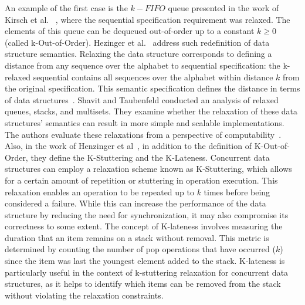 An example of the first case is the \(k-FIFO\) queue presented in the work of Kirsch et al. ~\cite{DBLP_conf_pact_KirschLP13, DBLP_conf_ica3pp_KirschPRS12}, where the sequential specification requirement was relaxed. The elements of this queue can be dequeued out-of-order up to a constant \(k \ge 0\) (called k-Out-of-Order). Hezinger et al.~\cite{DBLP_conf_popl_HenzingerKPSS13} address such redefinition of data structure semantics. Relaxing the data structure corresponds to defining a distance from any sequence over the alphabet to sequential specification: the k-relaxed sequential contains all sequences over the alphabet within distance \(k\) from the original specification. This semantic specification defines the distance in terms of data structures~\cite{DBLP_conf_popl_HenzingerKPSS13}. Shavit and Taubenfeld conducted an analysis of relaxed queues, stacks, and multisets. They examine whether the relaxation of these data structures' semantics can result in more simple and scalable implementations. The authors evaluate these relaxations from a perspective of computability~\cite{DBLP_journals_dc_ShavitT16}. Also, in the work of Henzinger et al~\cite{DBLP_conf_popl_HenzingerKPSS13}, in addition to the definition of K-Out-of-Order, they define the K-Stuttering and the K-Lateness. Concurrent data structures can employ a relaxation scheme known as K-Stuttering, which allows for a certain amount of repetition or stuttering in operation execution. This relaxation enables an operation to be repeated up to \(k\) times before being considered a failure. While this can increase the performance of the data structure by reducing the need for synchronization, it may also compromise its correctness to some extent. The concept of K-lateness involves measuring the duration that an item remains on a stack without removal. This metric is determined by counting the number of pop operations that have occurred (\(k\)) since the item was last the youngest element added to the stack. K-lateness is particularly useful in the context of k-stuttering relaxation for concurrent data structures, as it helps to identify which items can be removed from the stack without violating the relaxation constraints.

